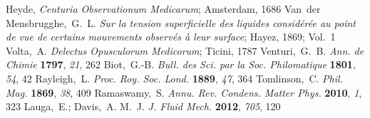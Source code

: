 \documentclass[journal=langd5, manuscript=article, layout=twocolumn]{achemso}
\begin{document}
\begin{mcitethebibliography}{27}
Heyde, \emph{Centuria Observationum Medicarum}; Amsterdam, 1686\relax
\mciteBstWouldAddEndPuncttrue
\mciteSetBstMidEndSepPunct{\mcitedefaultmidpunct}
{\mcitedefaultendpunct}{\mcitedefaultseppunct}\relax
\EndOfBibitem
{}
Van~der Mensbrugghe,~G.~L. \emph{Sur la tension superficielle des liquides
  consid{\'e}r{\'e}e au point de vue de certains mouvements observ{\'e}s {\`a}
  leur surface}; Hayez, 1869; Vol.~1\relax
\mciteBstWouldAddEndPuncttrue
\mciteSetBstMidEndSepPunct{\mcitedefaultmidpunct}
{\mcitedefaultendpunct}{\mcitedefaultseppunct}\relax
\EndOfBibitem
{}
Volta,~A. \emph{Delectus Opusculorum Medicorum}; Ticini, 1787\relax
\mciteBstWouldAddEndPuncttrue
\mciteSetBstMidEndSepPunct{\mcitedefaultmidpunct}
{\mcitedefaultendpunct}{\mcitedefaultseppunct}\relax
\EndOfBibitem
{}
Venturi,~G.~B. \emph{Ann. de Chimie} \textbf{1797}, \emph{21}, 262\relax
\mciteBstWouldAddEndPuncttrue
\mciteSetBstMidEndSepPunct{\mcitedefaultmidpunct}
{\mcitedefaultendpunct}{\mcitedefaultseppunct}\relax
\EndOfBibitem
{}
Biot,~G.-B. \emph{Bull. des Sci. par la Soc. Philomatique} \textbf{1801},
  \emph{54}, 42\relax
\mciteBstWouldAddEndPuncttrue
\mciteSetBstMidEndSepPunct{\mcitedefaultmidpunct}
{\mcitedefaultendpunct}{\mcitedefaultseppunct}\relax
\EndOfBibitem
{}
Rayleigh,~L. \emph{Proc. Roy. Soc. Lond.} \textbf{1889}, \emph{47}, 364\relax
\mciteBstWouldAddEndPuncttrue
\mciteSetBstMidEndSepPunct{\mcitedefaultmidpunct}
{\mcitedefaultendpunct}{\mcitedefaultseppunct}\relax
\EndOfBibitem
{}
Tomlinson,~C. \emph{Phil. Mag.} \textbf{1869}, \emph{38}, 409\relax
\mciteBstWouldAddEndPuncttrue
\mciteSetBstMidEndSepPunct{\mcitedefaultmidpunct}
{\mcitedefaultendpunct}{\mcitedefaultseppunct}\relax
\EndOfBibitem
{}
Ramaswamy,~S. \emph{Annu. Rev. Condens. Matter Phys.} \textbf{2010}, \emph{1},
  323\relax
\mciteBstWouldAddEndPuncttrue
\mciteSetBstMidEndSepPunct{\mcitedefaultmidpunct}
{\mcitedefaultendpunct}{\mcitedefaultseppunct}\relax
\EndOfBibitem
{}
Lauga,~E.; Davis,~A. M.~J. \emph{J. Fluid Mech.} \textbf{2012}, \emph{705},
  120\relax
\mciteBstWouldAddEndPuncttrue
\mciteSetBstMidEndSepPunct{\mcitedefaultmidpunct}
{\mcitedefaultendpunct}{\mcitedefaultseppunct}\relax
\EndOfBibitem
{}

\end{mcitethebibliography}
\end{document}
